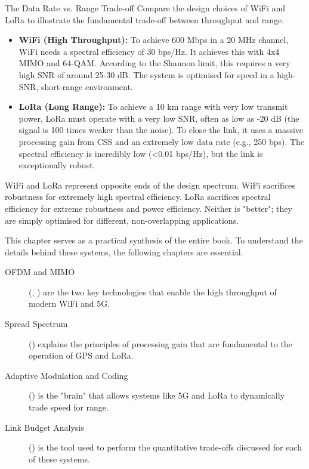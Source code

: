 \begin{workedexample}{The Data Rate vs. Range Trade-off}
     Compare the design choices of WiFi and LoRa to illustrate the fundamental trade-off between throughput and range.
    \begin{itemize}
        \item \textbf{WiFi (High Throughput):} To achieve 600 Mbps in a 20 MHz channel, WiFi needs a spectral efficiency of 30 bps/Hz. It achieves this with 4x4 MIMO and 64-QAM. According to the Shannon limit, this requires a very high SNR of around 25-30 dB. The system is optimised for speed in a high-SNR, short-range environment.
        \item \textbf{LoRa (Long Range):} To achieve a 10 km range with very low transmit power, LoRa must operate with a very low SNR, often as low as -20 dB (the signal is 100 times weaker than the noise). To close the link, it uses a massive processing gain from CSS and an extremely low data rate (e.g., 250 bps). The spectral efficiency is incredibly low (<0.01 bps/Hz), but the link is exceptionally robust.
    \end{itemize}
     WiFi and LoRa represent opposite ends of the design spectrum. WiFi sacrifices robustness for extremely high spectral efficiency. LoRa sacrifices spectral efficiency for extreme robustness and power efficiency. Neither is "better"; they are simply optimised for different, non-overlapping applications.
\end{workedexample}


\begin{importantbox}[title={Further Reading}]
    This chapter serves as a practical synthesis of the entire book. To understand the details behind these systems, the following chapters are essential.
    \begin{description}
        \item[OFDM and MIMO] (, ) are the two key technologies that enable the high throughput of modern WiFi and 5G.
        \item[Spread Spectrum] () explains the principles of processing gain that are fundamental to the operation of GPS and LoRa.
        \item[Adaptive Modulation and Coding] () is the "brain" that allows systems like 5G and LoRa to dynamically trade speed for range.
        \item[Link Budget Analysis] () is the tool used to perform the quantitative trade-offs discussed for each of these systems.
    \end{description}
\end{importantbox}

